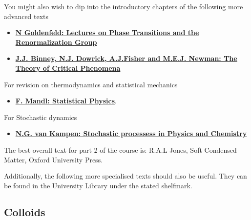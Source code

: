 \documentclass[
  letterpaper,
  enabledeprecatedfontcommands]{report}
\providecommand{\tightlist}{%
  \setlength{\itemsep}{0pt}\setlength{\parskip}{0pt}}
\begin{document}
You might also wish to dip into the introductory chapters of the
following more advanced texts

\begin{itemize}
\item
  \textbf{\href{https://bris.on.worldcat.org/search/detail/25914535?queryString=Lectures\%20on\%20Phase\%20Transitions\%20and\%20the\%20Renormalization\%20Group&clusterResults=true&stickyFacetsChecked=true&groupVariantRecords=false&newsArticles=off&bookReviews=off}{N
  Goldenfeld: Lectures on Phase Transitions and the Renormalization
  Group}}
\item
  \textbf{\href{https://bris.on.worldcat.org/search/detail/861559276?queryString=\%20The\%20Theory\%20of\%20Critical\%20Phenomena&clusterResults=true&stickyFacetsChecked=true&groupVariantRecords=false&newsArticles=off&bookReviews=off}{J.J.
  Binney, N.J. Dowrick, A.J.Fisher and M.E.J. Newman: The Theory of
  Critical Phenomena}}
\end{itemize}

For revision on thermodynamics and statistical mechanics

\begin{itemize}
\tightlist
\item
  \textbf{\href{https://bris.on.worldcat.org/search/detail/15487191?queryString=F.\%20Mandl&clusterResults=true&stickyFacetsChecked=true&groupVariantRecords=false}{F.
  Mandl: Statistical Physics}}.
\end{itemize}

For Stochastic dynamics

\begin{itemize}
\tightlist
\item
  \textbf{\href{https://bris.on.worldcat.org/search/detail/162131511?queryString=Stochastic\%20Processes\%20in\%20Physics\%20and\%20Chemistry\%20by\%20N.G.\%20van\%20Kampen&clusterResults=true&stickyFacetsChecked=true&groupVariantRecords=false}{N.G.
  van Kampen: Stochastic processess in Physics and Chemistry}}
\end{itemize}

The best overall text for part 2 of the course is: R.A.L Jones, Soft
Condensed Matter, Oxford University Press.

Additionally, the following more specialised texts should also be
useful. They can be found in the University Library under the stated
shelfmark.

\subsection*{Colloids}\label{colloids}
\end{document}
